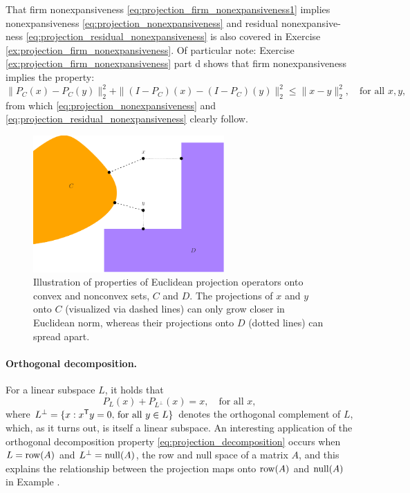 That firm nonexpansiveness \eqref{eq:projection_firm_nonexpansiveness1} implies 
nonexpansiveness \eqref{eq:projection_nonexpansiveness} and residual
nonexpansive- ness %
\eqref{eq:projection_residual_nonexpansiveness} is also covered in Exercise
\ref{ex:projection_firm_nonexpansiveness}. Of particular note: Exercise
\ref{ex:projection_firm_nonexpansiveness} part d shows that firm
nonexpansiveness implies the property:     
\begin{equation}
\label{eq:projection_firm_nonexpansiveness2}
\| P_C(x) - P_C(y) \|_2^2 + \| (I-P_C)(x) - (I-P_C)(y) \|_2^2 \leq 
\|x - y\|_2^2, \quad \text{for all $x,y$},
\end{equation}
from which \eqref{eq:projection_nonexpansiveness} and
\eqref{eq:projection_residual_nonexpansiveness} clearly follow.

\begin{figure}[tb]
\centering
\includegraphics[width=0.65\textwidth]{fig/projection.pdf}
\caption{Illustration of properties of Euclidean projection operators onto 
  convex and nonconvex sets, $C$ and $D$. The projections of $x$ and $y$ onto
  $C$ (visualized via dashed lines) can only grow closer in Euclidean norm,
  whereas their projections onto  $D$ (dotted lines) can spread apart.}    
\label{fig:projection}
\end{figure}

\paragraph{Orthogonal decomposition.}

For a linear subspace $L$, it holds that
\begin{equation}
\label{eq:projection_decomposition}
P_L(x) + P_{L^\perp}(x) = x, \quad \text{for all $x$},
\end{equation}
where $L^\perp = \{x : x^{\mathsf{T}} y = 0, \, \text{for all $y \in L$} \}$ denotes the
orthogonal complement of $L$, which, as it turns out, is itself a linear
subspace. An interesting application of the orthogonal decomposition property
\eqref{eq:projection_decomposition} occurs when $L = \operatorname{row}(A)$ and $L^\perp =
\operatorname{null}(A)$, the row and null space of a matrix $A$, and this explains the
relationship between the projection maps onto $\operatorname{row}(A)$ and $\operatorname{null}(A)$ in Example
. 

